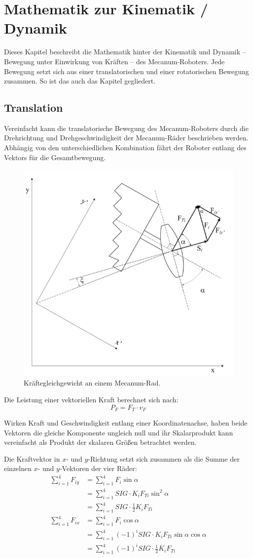\documentclass[a4paper]{article}
\begin{document}
\section{Mathematik zur Kinematik / Dynamik}
Dieses Kapitel beschreibt die Mathematik hinter der Kinematik und Dynamik -- Bewegung unter Einwirkung von Kräften -- des Mecanum-Roboters. Jede Bewegung setzt sich aus einer translatorischen und einer rotatorischen Bewegung zusammen. So ist das auch das Kapitel gegliedert.

\subsection{Translation}
Vereinfacht kann die translatorische Bewegung des Mecanum-Roboters durch die Drehrichtung und Drehgeschwindigkeit der Mecanum-Räder beschrieben werden. Abhängig von den unterschiedlichen Kombination fährt der Roboter entlang des Vektors für die Gesamtbewegung.
\begin{figure}[H]
    \centering
    \includegraphics[width=.6\textwidth]{kraefte}
    \caption{Kräftegleichgewicht an einem Mecanum-Rad.}
\end{figure}

Die Leistung einer vektoriellen Kraft berechnet sich nach:
$$ P_F = F_T \cdot v_F $$

Wirken Kraft und Geschwindigkeit entlang einer Koordinatenachse, haben beide Vektoren die gleiche Komponente ungleich null und ihr Skalarprodukt kann vereinfacht als Produkt der skalaren Größen betrachtet werden.

Die Kraftvektor in $x$- und $y$-Richtung setzt sich zusammen als die Summe der einzelnen $x$- und $y$-Vektoren der vier Räder:
\begin{align*}
\sum_{i=1}^4 F_{iy} &= \sum_{i=1}^4 F_i \sin \alpha \\
&= \sum_{i=1}^4 SIG \cdot K_i F_{Ti} \sin^2 \alpha \\
&= \sum_{i=1}^4 SIG \cdot \frac{1}{2} K_i F_{Ti} \\
\sum_{i=1}^4 F_{ix} &= \sum_{i=1}^4 F_i \cos \alpha \\
&= \sum_{i=1}^4 (-1)^i SIG \cdot K_i F_{Ti} \sin \alpha \cos \alpha \\
&= \sum_{i=1}^4 (-1)^i SIG \cdot \frac{1}{2} K_i F_{Ti} \\
\end{align*}
\end{document}
